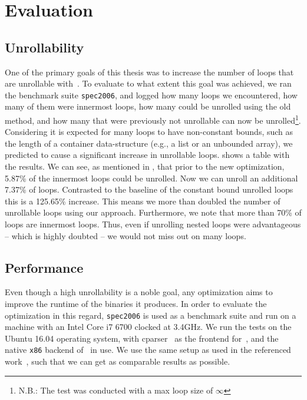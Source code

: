 \chapter{Evaluation}\label{sec:eval}

\section{Unrollability}\label{sec:eval:unrollability}

One of the primary goals of this thesis was to increase the number of loops that are unrollable with~\libFIRM.
To evaluate to what extent this goal was achieved, we ran the benchmark suite \texttt{spec2006}, and logged how many loops we encountered, how many of them were innermost loops, how many could be unrolled using the old method, and how many that were previously not unrollable can now be unrolled\footnote{N.B.: The test was conducted with a max loop size of $\infty$}.
Considering it is expected for many loops to have non-constant bounds, such as the length of a container data-structure (e.g., a list or an unbounded array), we predicted to cause a significant increase in unrollable loops.
 shows a table with the results.
We can see, as mentioned in , that prior to the new optimization, 5.87\% of the innermost loops could be unrolled.
Now we can unroll an additional 7.37\% of loops.
Contrasted to the baseline of the constant bound unrolled loops this is a 125.65\% increase.
This means we more than doubled the number of unrollable loops using our approach.
Furthermore, we note that more than 70\% of loops are innermost loops.
Thus, even if unrolling nested loops were advantageous -- which is highly doubted -- we would not miss out on many loops.




\section{Performance}\label{sec:eval:perf}

Even though a high unrollability is a noble goal, any optimization aims to improve the runtime of the binaries it produces.
In order to evaluate the optimization in this regard, \texttt{spec2006} is used as a benchmark suite and run on a machine with an Intel Core i7 6700 clocked at 3.4GHz.
We run the tests on the Ubuntu 16.04 operating system, with cparser~\cite{cparser} as the frontend for~\libFIRM, and the native \texttt{x86} backend of~\libFIRM{} in use.
We use the same setup as used in the referenced work~\cite{aebi18bachelorarbeit}, such that we can get as comparable results as possible.

